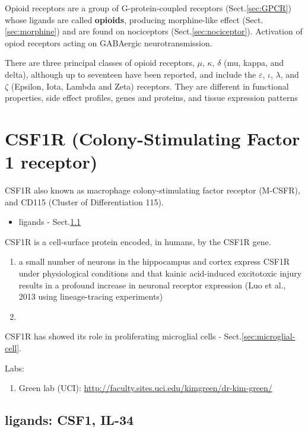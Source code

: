 Opioid receptors are a group of G-protein-coupled receptors
(Sect.\ref{sec:GPCR}) whose ligands are called {\bf opioids}, producing
morphine-like effect (Sect.\ref{sec:morphine}) and are found on nociceptors
(Sect.\ref{sec:nociceptor}).
Activation of opiod receptors acting on GABAergic neurotransmission. 

There are three principal classes of opioid receptors, $\mu$, $\kappa$, $\delta$
(mu, kappa, and delta), although up to seventeen have been reported, and include
the $\varepsilon$, $\iota$, $\lambda$, and $\zeta$ (Epsilon, Iota, Lambda and
Zeta) receptors.
They are different in functional properties, side effect profiles, genes and proteins, and tissue
expression patterns



\section{CSF1R (Colony-Stimulating Factor 1 receptor)}
\label{sec:CSF1R}

CSF1R also known as macrophage colony-stimulating factor receptor (M-CSFR), and
CD115 (Cluster of Differentiation 115). 
\begin{itemize}
  \item ligands - Sect.\ref{sec:CSF1R-ligands}
\end{itemize}

CSF1R is a cell-surface protein encoded, in humans, by the CSF1R gene.
\begin{enumerate}

  \item   a small number of neurons in the hippocampus and cortex express CSF1R
  under physiological conditions and that kainic acid-induced excitotoxic injury
  results in a profound increase in neuronal receptor expression   (Luo et al.,
  2013 using lineage-tracing experiments)

  \item 
\end{enumerate}


CSF1R has showed its role in proliferating microglial cells -
Sect.\ref{sec:microglial-cell}.


Labs:
\begin{enumerate}
  \item Green lab
  (UCI): \url{http://faculty.sites.uci.edu/kimgreen/dr-kim-green/}
\end{enumerate}

\subsection{ligands: CSF1, IL-34}
\label{sec:CSF1R-ligands}
\label{sec:CSF1}
\label{sec:IL-34}

